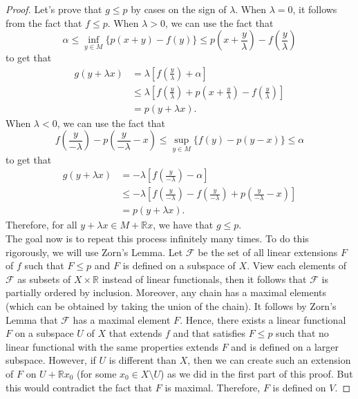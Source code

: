 \documentclass{article}
\newcommand{\R}{\mathbb{R}}
\begin{document}
\begin{proof}
    Let's prove that $g \leq p$ by cases on the sign of $\lambda$. When $\lambda = 0$, it follows from the fact that $f \leq p$. When $\lambda > 0$, we can use the fact that
    $$\alpha \leq \inf_{y \in M}\{p(x + y) - f(y)\} \leq p\left(x + \frac{y}{\lambda}\right) - f\left(\frac{y}{\lambda}\right)$$
    to get that
    \begin{align*}
        g(y + \lambda x) &= \lambda \left[f\left(\frac{y}{\lambda}\right) + \alpha\right] \\
        &\leq \lambda \left[f\left(\frac{y}{\lambda}\right) + p\left(x + \frac{y}{\lambda}\right) - f\left(\frac{y}{\lambda}\right)\right] \\
        &= p(y + \lambda x).
    \end{align*}
    When $\lambda < 0$, we can use the fact that
    $$f\left(\frac{y}{-\lambda}\right) - p\left(\frac{y}{-\lambda} - x\right) \leq \sup_{y \in M}\{f(y) - p(y - x)\} \leq \alpha$$
    to get that
    \begin{align*}
        g(y + \lambda x) &= -\lambda \left[f\left(\frac{y}{-\lambda}\right) - \alpha\right] \\
        &\leq -\lambda \left[f\left(\frac{y}{-\lambda}\right) - f\left(\frac{y}{-\lambda}\right) + p\left(\frac{y}{-\lambda} - x\right) \right] \\
        &= p(y + \lambda x).
    \end{align*}
    Therefore, for all $y + \lambda x \in M + \R x$, we have that $g \leq p$. \\
    The goal now is to repeat this process infinitely many times. To do this rigorously, we will use Zorn's Lemma. Let $\mathcal{F}$ be the set of all linear extensions $F$ of $f$ such that $F \leq p$ and $F$ is defined on a subspace of $X$. View each elements of $\mathcal{F}$ as subsets of $X \times \R$ instead of linear functionals, then it follows that $\mathcal{F}$ is partially ordered by inclusion. Moreover, any chain has a maximal elements (which can be obtained by taking the union of the chain). It follows by Zorn's Lemma that $\mathcal{F}$ has a maximal element $F$. Hence, there exists a linear functional $F$ on a subspace $U$ of $X$ that extends $f$ and that satisfies $F \leq p$ such that no linear functional with the same properties extends $F$ and is defined on a larger subspace. However, if $U$ is different than $X$, then we can create such an extension of $F$ on $U + \R x_0$ (for some $x_0 \in X\setminus U$) as we did in the first part of this proof. But this would contradict the fact that $F$ is maximal. Therefore, $F$ is defined on $V$.
\end{proof}
\end{document}
